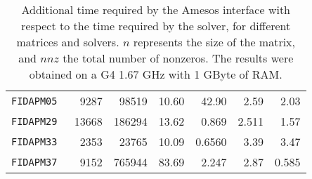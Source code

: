 \documentclass[acmtocl]{acmtrans2m}
\begin{document}
\begin{table}
\begin{center}
\begin{tabular}{|l r r r| r r r|}
\tt FIDAPM05 & 9287  & 98519  & 10.60 & 42.90  & 2.59  & 2.03  \\
\tt FIDAPM29 & 13668 & 186294 & 13.62 & 0.869  & 2.511 & 1.57  \\
\tt FIDAPM33 & 2353  & 23765  & 10.09 & 0.6560 & 3.39  & 3.47  \\
\tt FIDAPM37 & 9152  & 765944 & 83.69 & 2.247  & 2.87  & 0.585 \\
\hline
\end{tabular}
\caption{Additional time required by the Amesos interface with respect to the
time required by the solver, for different matrices and solvers. $n$
  represents the size of the matrix, and $nnz$ the total number of nonzeros.
The results were obtained on a G4 1.67 GHz with 1 GByte of RAM.}
\label{tab:interface}
\end{center}
\end{table}



\end{document}
